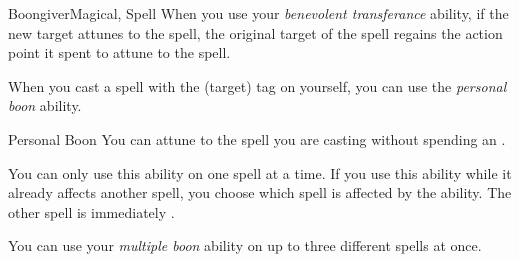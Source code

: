 \begin{feat}{Boongiver}{Magical, Spell}
         When you use your \textit{benevolent transferance} ability, if the new target attunes to the spell, the original target of the spell regains the action point it spent to attune to the spell.

         When you cast a spell with the  (target) tag on yourself, you can use the \textit{personal boon} ability.
        \begin{ability}{Personal Boon}
            You can attune to the spell you are casting without spending an .

            You can only use this ability on one spell at a time.
            If you use this ability while it already affects another spell, you choose which spell is affected by the ability.
            The other spell is immediately .
        \end{ability}

         You can use your \textit{multiple boon} ability on up to three different spells at once.
    \end{feat}

